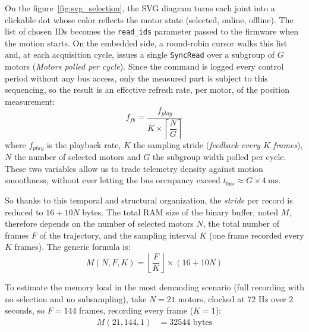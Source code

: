 \documentclass{tropLaClasse}
\begin{document}
On the figure~\ref{fig:svg_selection}, the SVG diagram turns each joint into a clickable dot whose color reflects the motor state (selected, online, offline). The list of chosen IDs becomes the \texttt{read\_ids} parameter passed to the firmware when the motion starts. On the embedded side, a round-robin cursor walks this list and, at each acquisition cycle, issues a single \texttt{SyncRead} over a subgroup of $G$ motors (\textit{Motors polled per cycle}). Since the command is logged every control period without any bus access, only the measured part is subject to this sequencing, so the result is an effective refresh rate, per motor, of the position measurement:
\begin{equation}
f_{fb} = \frac{f_{play}}{K \times \left\lceil \dfrac{N}{G} \right\rceil}
\end{equation}
where $f_{play}$ is the playback rate, $K$ the sampling stride (\textit{feedback every $K$ frames}), $N$ the number of selected motors and $G$ the subgroup width polled per cycle. These two variables allow us to trade telemetry density against motion smoothness, without ever letting the bus occupancy exceed $t_{bus} \approx G \times 4~\text{ms}$.



So thanks to this temporal and structural organization, the \textit{stride} per record is reduced to $16 + 10N$ bytes. The total RAM size of the binary buffer, noted $M$, therefore depends on the number of selected motors $N$, the total number of frames $F$ of the trajectory, and the sampling interval $K$ (one frame recorded every $K$ frames). The generic formula is:
\begin{equation}
M(N, F, K) = \left\lfloor \frac{F}{K} \right\rfloor \times (16 + 10N)
\end{equation}

To estimate the memory load in the most demanding scenario (full recording with no selection and no subsampling), take $N = 21$ motors, clocked at 72 Hz over 2 seconds, so $F = 144$ frames, recording every frame ($K = 1$):
\begin{align*}
M(21, 144, 1) &= 32544 \text{ bytes}
\end{align*}
\end{document}
